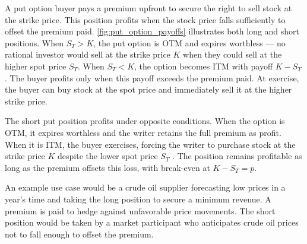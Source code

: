 \documentclass[english,12pt,a4paper,pdftex,sci,utf8]{aaltothesis}
\begin{document}
A put option buyer pays a premium upfront to secure the right to sell stock at the strike price. This position profits when the stock price falls sufficiently to offset the premium paid. \cref{fig:put_option_payoffs} illustrates both long and short positions. When $S_T > K$, the put option is OTM and expires worthless --- no rational investor would sell at the strike price $K$ when they could sell at the higher spot price $S_T$. When $S_T < K$, the option becomes ITM with payoff $K - S_T$ \cite{hull2018}. The buyer profits only when this payoff exceeds the premium paid. At exercise, the buyer can buy stock at the spot price and immediately sell it at the higher strike price.

The short put position profits under opposite conditions. When the option is OTM, it expires worthless and the writer retains the full premium as profit. When it is ITM, the buyer exercises, forcing the writer to purchase stock at the strike price $K$ despite the lower spot price $S_T$ \cite{hull2018}. The position remains profitable as long as the premium offsets this loss, with break-even at $K - S_T = p$.

An example use case would be a crude oil supplier forecasting low prices in a year's time and taking the long position to secure a minimum revenue. A premium is paid to hedge against unfavorable price movements. The short position would be taken by a market participant who anticipates crude oil prices not to fall enough to offset the premium.
\end{document}
